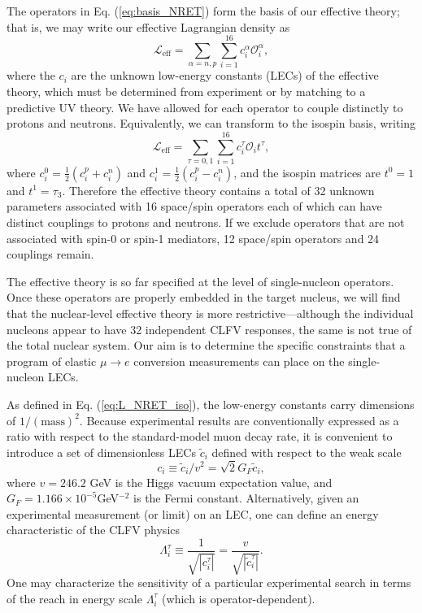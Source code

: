 \documentclass[12pt,letterpaper]{book}
\begin{document}
The operators in Eq. (\ref{eq:basis_NRET}) form the basis of our effective theory; that is, we may write our effective Lagrangian density as
\begin{equation}
\mathcal{L}_\mathrm{eff}=\sum_{\alpha=n,p}\sum_{i=1}^{16}c_i^{\alpha}\mathcal{O}_i^{\alpha},
\end{equation}
where the $c_i$ are the unknown low-energy constants (LECs) of the effective theory, which must be determined from experiment or by matching to a predictive UV theory. We have allowed for each operator to couple distinctly to protons and neutrons. Equivalently, we can transform to the isospin basis, writing
\begin{equation}
\mathcal{L}_\mathrm{eff}=\sum_{\tau=0,1}\sum_{i=1}^{16}c^{\tau}_i\mathcal{O}_it^{\tau},
\label{eq:L_NRET_iso}
\end{equation}
where $c^0_i=\frac{1}{2}\left(c_i^p+c_i^n\right)$ and $c_i^1=\frac{1}{2}\left(c_i^p-c_i^n\right)$, and the isospin matrices are $t^0=1$ and $t^1=\tau_3$. Therefore the effective theory contains a total of 32 unknown parameters associated with 16 space/spin operators each of which can have distinct couplings to protons and neutrons. If we exclude operators that are not associated with spin-0 or spin-1 mediators, 12 space/spin operators and 24 couplings remain. 

The effective theory is so far specified at the level of single-nucleon operators. Once these operators are properly embedded in the target nucleus, we will find that the nuclear-level effective theory is more restrictive---although the individual nucleons appear to have 32 independent CLFV responses, the same is not true of the total nuclear system. Our aim is to determine the specific constraints that a program of elastic $\mu\rightarrow e$ conversion measurements can place on the single-nucleon LECs.

As defined in Eq. (\ref{eq:L_NRET_iso}), the low-energy constants carry dimensions of $1/(\mathrm{mass})^2$. Because experimental results are conventionally expressed as a ratio with respect to the standard-model muon decay rate, it is convenient to introduce a set of dimensionless LECs $\tilde{c}_i$ defined with respect to the weak scale
\begin{equation}
c_i\equiv \tilde{c}_i/v^2=\sqrt{2}G_F\tilde{c}_i,
\end{equation}
where $v=246.2$ GeV is the Higgs vacuum expectation value, and $G_F=1.166\times 10^{-5}$GeV$^{-2}$ is the Fermi constant. Alternatively, given an experimental measurement (or limit) on an LEC, one can define an energy characteristic of the CLFV physics
\begin{equation}
\Lambda_i^{\tau}\equiv\frac{1}{\sqrt{|c_i^{\tau}|}}=\frac{v}{\sqrt{|\tilde{c}_i^{\tau}|}}.
\end{equation}
One may characterize the sensitivity of a particular experimental search in terms of the reach in energy scale $\Lambda^\tau_i$ (which is operator-dependent).
\end{document}
